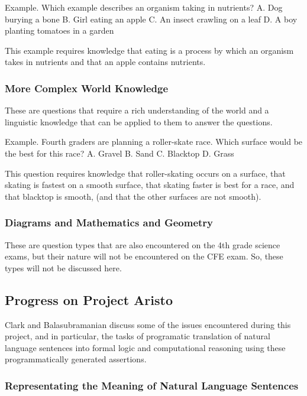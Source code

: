 Example. Which example describes an organism taking in nutrients? A. Dog burying a bone B. Girl eating an apple C. An insect crawling on a leaf D. A boy planting tomatoes in a garden \cite{clark2015elementary}

This example requires knowledge that eating is a process by which an organism takes in nutrients and that an apple contains nutrients.

\subsubsection{More Complex World Knowledge}

These are questions that require a rich understanding of the world and a linguistic knowledge that can be applied to them to answer the questions.

Example.  Fourth graders are planning a roller-skate race.  Which surface would be the best for this race?  A. Gravel B. Sand C. Blacktop D. Grass \cite{clark2015elementary}

This question requires knowledge that roller-skating occurs on a surface, that skating is fastest on a smooth surface, that skating faster is best for a race, and that blacktop is smooth, (and that the other surfaces are not smooth).

\subsubsection{Diagrams and Mathematics and Geometry}

These are question types that are also encountered on the 4th grade science exams, but their nature will not be encountered on the CFE exam.  So, these types will not be discussed here.

\subsection{Progress on Project Aristo}

Clark and Balasubramanian \cite{clark2014interpreting} discuss some of the 
issues encountered during this project, and in particular, the tasks of programatic 
translation of natural language sentences into formal logic and computational 
reasoning using these programmatically generated assertions.

\subsubsection{Representating the Meaning of Natural Language Sentences}

